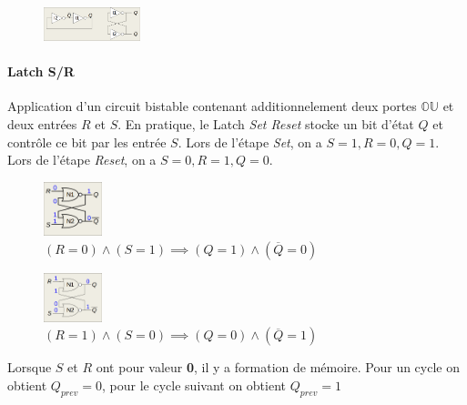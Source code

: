 \documentclass{report}
\begin{document}
\begin{multicols*}{3}
   \begin{figure}[H]
    \begin{center}
      \includegraphics[width=0.25\textwidth]{CirBistable.png}
    \end{center}
   \end{figure}

   \paragraph{Latch S/R}
   Application d'un circuit bistable contenant 
   additionnelement deux portes $\mathbb{OU}$ 
   et deux entrées $R$ et $S$. En pratique, le 
   Latch \textit{Set Reset} stocke un bit d'état 
   $Q$ et contrôle ce bit par les entrée 
   $S$. Lors de l'étape \textit{Set}, 
   on a $S = 1, R = 0, Q =1 $. Lors de l'étape 
   \textit{Reset}, on a 
   $S = 0, R = 1, Q = 0$. 


   \begin{figure}[H]
    \begin{center}
      \includegraphics[width=0.15\textwidth]{Latch1.png}
    \end{center}
    \caption{\tiny$(R = 0)\land(S = 1) \implies (Q = 1) 
    \land(\overline{Q} = 0)$}
   \end{figure}


   \begin{figure}[H]
    \begin{center}
      \includegraphics[width=0.15\textwidth]{Latch2.png}
    \end{center}
    \caption{\tiny$(R = 1)\land(S = 0) \implies (Q = 0) 
    \land(\overline{Q} = 1)$}
   \end{figure}

   Lorsque $S$ et $R$ ont pour valeur \textbf{0}, 
   il y a formation de mémoire. Pour un cycle on 
   obtient $Q_{prev} = 0$, pour le cycle suivant 
   on obtient $Q_{prev} = 1$


\end{multicols*}
\end{document}
